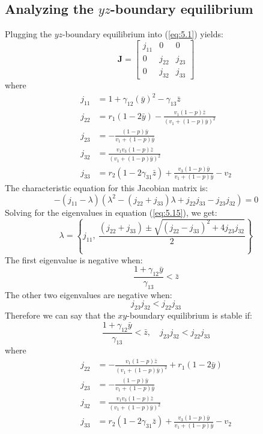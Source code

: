 \subsection{Analyzing the $yz$-boundary equilibrium}\label{subsec:stability_yz_boundary_equilibrium}
Plugging the $yz$-boundary equilibrium into (\ref{eq:5.1}) yields:
\begin{equation}
    \textbf{J}=\begin{bmatrix}
        j_{11} & 0 & 0\\
        0 & j_{22} & j_{23}\\
        0 & j_{32} & j_{33}
    \end{bmatrix}
    \label{eq:5.14}
\end{equation}
where
\begin{align*}
    j_{11} &= 1+\gamma_{12}\left(\bar{y}\right)^2-\gamma_{13}\bar{z}\\
    j_{22} &= r_1\left(1-2\bar{y}\right)-\frac{v_1\left(1-p\right)\bar{z}}{\left(v_1+\left(1-p\right)\bar{y}\right)^2}\\
    j_{23} &= -\frac{\left(1-p\right)\bar{y}}{v_1+\left(1-p\right)\bar{y}}\\
    j_{32} &= \frac{v_1v_3\left(1-p\right)\bar{z}}{\left(v_1+\left(1-p\right)\bar{y}\right)^2}\\
    j_{33} &= r_2\left(1-2\gamma_{31}\bar{z}\right)+\frac{v_3\left(1-p\right)\bar{y}}{v_1+\left(1-p\right)\bar{y}}-v_2
\end{align*}
The characteristic equation for this Jacobian matrix is:
\begin{equation}
    -\left(j_{11}-\lambda\right)\left(\lambda^2-\left(j_{22}+j_{33}\right)\lambda+j_{22}j_{33}-j_{23}j_{32}\right)=0
    \label{eq:5.15}
\end{equation}
Solving for the eigenvalues in equation (\ref{eq:5.15}), we get:
\[
\lambda=\left\{
j_{11},\ 
\frac{\left(j_{22}+j_{33}\right)\pm\sqrt{\left(j_{22}-j_{33}\right)^2+4j_{23}j_{32}}}{2}
\right\}
\]
The first eigenvalue is negative when:
\[
\frac{1+\gamma_{12}\bar{y}}{\gamma_{13}}<\bar{z}
\]
The other two eigenvalues are negative when:
\[
j_{23}j_{32}<j_{22}j_{33}
\]
Therefore we can say that the $xy$-boundary equilibrium is stable if:
\[
\frac{1+\gamma_{12}\bar{y}}{\gamma_{13}}<\bar{z},\quad 
j_{23}j_{32}<j_{22}j_{33}
\]
where
\begin{align*}
    j_{22} &= -\frac{v_1\left(1-p\right)\bar{z}}{\left(v_1+\left(1-p\right)\bar{y}\right)^2}+r_1\left(1-2\bar{y}\right)\\
    j_{23} &= -\frac{\left(1-p\right)\bar{y}}{v_1+\left(1-p\right)\bar{y}}\\
    j_{32} &= \frac{v_1v_3\left(1-p\right)\bar{z}}{\left(v_1+\left(1-p\right)\bar{y}\right)^2}\\
    j_{33} &= r_2\left(1-2\gamma_{31}\bar{z}\right)+\frac{v_3\left(1-p\right)\bar{y}}{v_1+\left(1-p\right)\bar{y}}-v_2
\end{align*}

